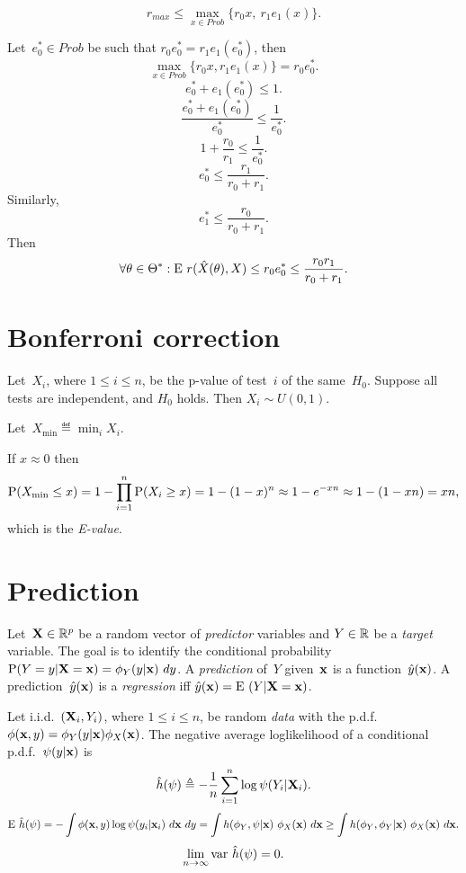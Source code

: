 \documentclass[10pt,a4paper]{article}
\theoremstyle{plain} \newtheorem{Lem}{Lemma}
\begin{document}
$$r_{max} \le \max_{x \in Prob} \{ r_0 x, \ r_1 e_1(x) \}. $$

Let~$e_0^* \in Prob$ be such that $r_0 e_0^* = r_1 e_1(e_0^*)$, then
$$ \max_{x \in Prob} \{ r_0 x, r_1 e_1(x) \} = r_0 e_0^*. $$
$$ e_0^* + e_1(e_0^*) \le 1. $$
$$ \frac {e_0^* + e_1(e_0^*)} {e_0^*} \le \frac 1 {e_0^*}. $$
$$ 1 + \frac {r_0} {r_1} \le  \frac 1 {e_0^*}. $$
$$ e_0^* \le \frac {r_1} {r_0 + r_1}. $$
Similarly,
$$ e_1^* \le \frac {r_0} {r_0 + r_1}. $$
Then
$$ \forall \theta \in \Theta^* : \E r(\hat X(\theta), X) \le r_0 e_0^* \le \frac {r_0 r_1} {r_0 + r_1}. $$


\section{Bonferroni correction}

Let~$X_i$, where $1 \le i \le n$, be the p-value of test~$i$ of the same~$H_0$.
Suppose all tests are independent, and $H_0$ holds.
Then $X_i \sim U(0,1)$.

Let~$X_{\min} \eqdef \min_i X_i$.

If $x \approx 0$ then
$$ \P(X_{\min} \le x) = 1 - \prod_{i=1}^n \P(X_i \ge x) = 1 - (1 - x)^n \approx 1 - e^{-xn} \approx 1 - (1 - xn) = xn, $$
which is the {\em E-value}.



\section{Prediction}

Let~$\ve X \in \R^p$ be a random vector of {\em predictor} variables and $Y \in \R$ be a {\em target} variable.
The goal is to identify the conditional probability $\P(Y=y|\ve X = \ve x) = \phi_Y(y|\ve x) \ dy$.
A {\em prediction} of~$Y$ given~$\ve x$ is a function~$\hat y(\ve x)$.
A prediction~$\hat y(\ve x)$ is a {\em regression} iff $\hat y(\ve x) = \E (Y|\ve X = \ve x)$.

Let i.i.d.~$(\ve X_i, Y_i)$, where $1 \le i \le n$, be random {\em data} with the p.d.f.~$\phi(\ve x,y) = \phi_Y(y|\ve x) \phi_X(\ve x)$.
The negative average loglikelihood of a conditional p.d.f.~$\psi(y|\ve x)$ is
$$ \hat h(\psi) \eqdef - \frac 1 n \sum_{i=1}^n \log \psi(Y_i|\ve X_i). $$
$$ \E \hat h(\psi) = - \int \phi(\ve x,y) \log \psi(y_i|\ve x_i) \ d \ve x \ d y
     =   \int h(\phi_Y, \psi | \ve x) \ \phi_X(\ve x) \ d \ve x
     \ge \int h(\phi_Y, \phi_Y | \ve x) \ \phi_X(\ve x) \ d \ve x.
$$
$$ \lim_{n \to \infty} \var \hat h(\psi) = 0. $$
\end{document}
